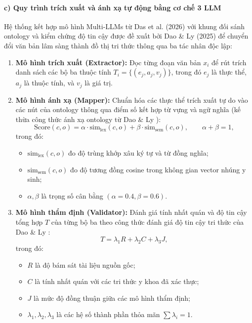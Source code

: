 \paragraph{c) Quy trình trích xuất và ánh xạ tự động bằng cơ chế 3 LLM}
Hệ thống kết hợp mô hình Multi-LLMs từ Das et al. (2026) \cite{das2025clinicalkg} với khung đối sánh ontology và kiểm chứng độ tin cậy được đề xuất bởi Dao \& Ly (2025) \cite{dao2025ontology} để chuyển đổi văn bản lâm sàng thành đồ thị tri thức thông qua ba tác nhân độc lập:
\begin{enumerate}
    \item \textbf{Mô hình trích xuất (Extractor):} Đọc từng đoạn văn bản $x_i$ để rút trích danh sách các bộ ba thuộc tính $T_i = \{(e_j, a_j, v_j)\}$, trong đó $e_j$ là thực thể, $a_j$ là thuộc tính, và $v_j$ là giá trị.
    \item \textbf{Mô hình ánh xạ (Mapper):} Chuẩn hóa các thực thể trích xuất tự do vào các nút của ontology thông qua điểm số kết hợp từ vựng và ngữ nghĩa (kế thừa công thức ánh xạ ontology từ Dao \& Ly \cite{dao2025ontology}):
    \begin{equation}
        \mathrm{Score}(c, o) = \alpha \cdot \mathrm{sim}_{\mathrm{lex}}(c, o) + \beta \cdot \mathrm{sim}_{\mathrm{sem}}(c, o), \qquad \alpha + \beta = 1,
    \end{equation}
    trong đó:
    \begin{itemize}
        \item $\mathrm{sim}_{\mathrm{lex}}(c, o)$ đo độ trùng khớp xâu ký tự và từ đồng nghĩa;
        \item $\mathrm{sim}_{\mathrm{sem}}(c, o)$ đo độ tương đồng cosine trong không gian vector nhúng y sinh;
        \item $\alpha, \beta$ là trọng số cân bằng $(\alpha = 0.4, \beta = 0.6)$.
    \end{itemize}
    \item \textbf{Mô hình thẩm định (Validator):} Đánh giá tính nhất quán và độ tin cậy tổng hợp $T$ của từng bộ ba theo công thức đánh giá độ tin cậy tri thức của Dao \& Ly \cite{dao2025ontology}:
    \begin{equation}
        T = \lambda_1 R + \lambda_2 C + \lambda_3 J,
    \end{equation}
    trong đó:
    \begin{itemize}
        \item $R$ là độ bám sát tài liệu nguồn gốc;
        \item $C$ là tính nhất quán với các tri thức y khoa đã xác thực;
        \item $J$ là mức độ đồng thuận giữa các mô hình thẩm định;
        \item $\lambda_1, \lambda_2, \lambda_3$ là các hệ số thành phần thỏa mãn $\sum \lambda_i = 1$.
    \end{itemize}
\end{enumerate}

